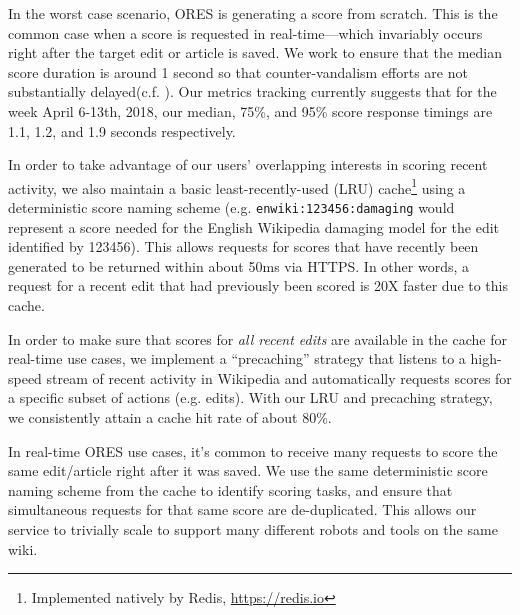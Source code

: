 In the worst case scenario, ORES is generating a score from scratch.  This is the common case when a score is requested in real-time---which invariably occurs right after the target edit or article is saved.  We work to ensure that the median score duration is around 1 second so that counter-vandalism efforts are not substantially delayed(c.f. \cite{geiger2013levee}).  Our metrics tracking currently suggests that for the week April 6-13th, 2018, our median, 75\%, and 95\% score response timings are 1.1, 1.2, and 1.9 seconds respectively.

In order to take advantage of our users' overlapping interests in scoring recent activity, we also maintain a basic least-recently-used (LRU) cache\footnote{Implemented natively by Redis, \url{https://redis.io}} using a deterministic score naming scheme (e.g. \texttt{enwiki:123456:damaging} would represent a score needed for the English Wikipedia damaging model for the edit identified by 123456).  This allows requests for scores that have recently been generated to be returned within about 50ms via HTTPS.  In other words, a request for a recent edit that had previously been scored is 20X faster due to this cache.

In order to make sure that scores for \emph{all recent edits} are available in the cache for real-time use cases, we implement a ``precaching'' strategy that listens to a high-speed stream of recent activity in Wikipedia and automatically requests scores for a specific subset of actions (e.g. edits).  With our LRU and precaching strategy, we consistently attain a cache hit rate of about 80\%.

In real-time ORES use cases, it's common to receive many requests to score the same edit/article right after it was saved.  We use the same deterministic score naming scheme from the cache to identify scoring tasks, and ensure that simultaneous requests for that same score are de-duplicated.  This allows our service to trivially scale to support many different robots and tools on the same wiki.

